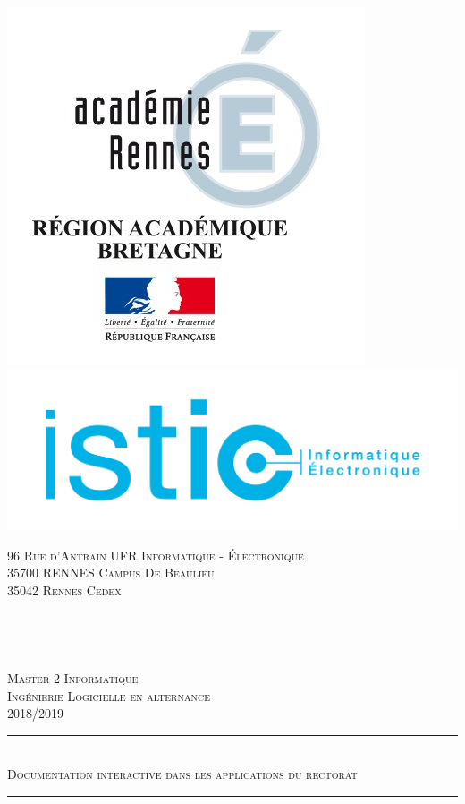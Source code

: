 \documentclass[12pt]{article}
\begin{document}
\begin{titlepage}
	
    \vspace*{0.0 cm}
    \begin{flushleft}
    
    \includegraphics  [scale = 0.6] {diagrammes/logo_Rectorat.jpg}\includegraphics  [scale = 0.1] {diagrammes/lo.png}
    \end{flushleft}
    \textsc{96 Rue d'Antrain}\hspace{100 pt}\textsc{ UFR Informatique - Électronique }\\
    \hspace{20 pt}\textsc{35700 RENNES }\hspace{200 pt}\textsc{Campus De Beaulieu}\\
   \text{ } \hspace{289 pt}\textsc{35042 Rennes Cedex}\\
   \\
   \\
   \\
   \\
 	\centering   %
	\textsc{\large Master 2 Informatique}\\
		\textsc{\large Ingénierie Logicielle en alternance}\\
		\textsc{\large 2018/2019}\\
	\rule{\linewidth}{0.7 mm} \\[0.2 cm]
	\textsc{\large Documentation interactive dans les applications du rectorat}\\
	\rule{\linewidth}{0.2 mm} \\[0.2 cm]


\end{titlepage}
\end{document}

